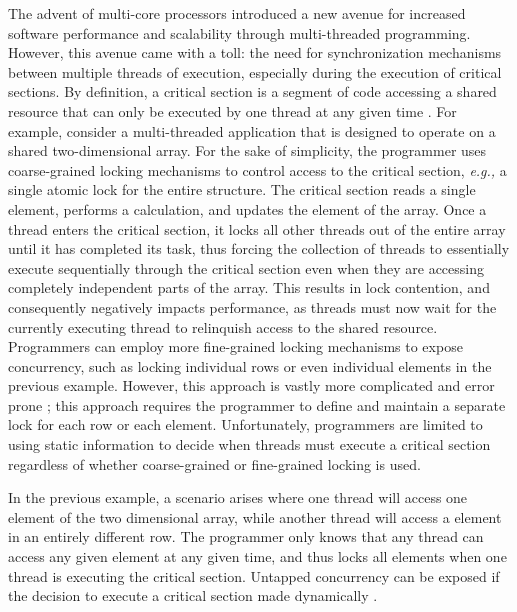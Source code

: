 \documentclass[11pt]{book}
\begin{document}
The advent of multi-core processors introduced a new avenue for increased software
performance and scalability through multi-threaded programming.  However, this avenue came
with a toll: the need for synchronization mechanisms between multiple threads of
execution, especially during the execution of critical sections.  By definition, a
critical section is a segment of code accessing a shared resource that can only be
executed by one thread at any given time \cite{os_concepts}.  For example, consider a
multi-threaded application that is designed to operate on a shared two-dimensional array.
For the sake of simplicity, the programmer uses coarse-grained locking mechanisms to
control access to the critical section, \emph{e.g.,} a single atomic lock for the entire
structure.  The critical section reads a single element, performs a calculation, and
updates the element of the array.  Once a thread enters the critical section, it locks all
other threads out of the entire array until it has completed its task, thus forcing the
collection of threads to essentially execute sequentially through the critical section
even when they are accessing completely independent parts of the array.  This results
in lock contention, and consequently negatively impacts performance, as threads must now
wait for the currently executing thread to relinquish access to the shared resource.
Programmers can employ more fine-grained locking mechanisms to expose concurrency, such as
locking individual rows or even individual elements in the previous example.  However,
this approach is vastly more complicated and error prone \cite{sle_rajwar}; this approach
requires the programmer to define and maintain a separate lock for each row or each
element.  Unfortunately, programmers are limited to using static information to decide
when threads must execute a critical section regardless of whether coarse-grained or
fine-grained locking is used.

In the previous example, a scenario arises where one thread will access one element of the
two dimensional array, while another thread will access a element in an entirely different
row.  The programmer only knows that any thread can access any given element at any given
time, and thus locks all elements when one thread is executing the critical
section. Untapped concurrency can be exposed if the decision to execute a critical section
made dynamically \cite{intel_prog_ref}.

\end{document}
